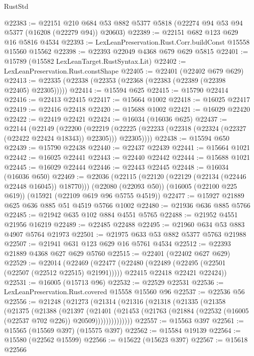 \begin{lexlean}{RustStd}
\begin{coremodule}
@22383 := @22151
    @210
    @684
    @53
    @882
    @5377
    @5818
    (@22274 @94 @53 @94 @5377 (@16208 (@22279 @94)) @20603)
@22389 := @22151 @682 @123 @629 @16 @5816 @4534
@22393 := LexLeanPreservation.Rust.Corr.buildConst @15558 @15560 @15562
@22398 := @22393 @22049 @4368 @679 @629 @5815
@22401 := @15789 (@15582 LexLeanTarget.RustSyntax.Lit)
@22402 := LexLeanPreservation.Rust.constShape
@22405 := @22401 (@22402 @679 @629)
@22413 := @22335 (@22338 (@22353 (@22368 (@22383 (@22389 (@22398 @22405) @22305)))))
@22414 := @15594 @625
@22415 := @15790 @22414
@22416 := @22413 @22415
@22417 := @15664 @1002
@22418 := @16025 @22417
@22419 := @22416 @22418
@22420 := @15688 @1002
@22421 := @16029 @22420
@22422 := @22419 @22421
@22424 := @16034 (@16036 @625)
@22437 := @22144
    (@22149
      (@22200
        (@22219 (@22225 (@22233 (@22318 (@22324 (@22327 (@22422 @22424 @18343)) @22305))) @22305))))
@22438 := @15594 @650
@22439 := @15790 @22438
@22440 := @22437 @22439
@22441 := @15664 @1021
@22442 := @16025 @22441
@22443 := @22440 @22442
@22444 := @15688 @1021
@22445 := @16029 @22444
@22446 := @22443 @22445
@22448 := @16034 (@16036 @650)
@22469 := @22036
    (@22115 (@22120 (@22129 (@22134 (@22446 @22448 @16045)) @18770)))
    (@22080 (@22093 @50))
    (@16005 (@22100 @225 @619))
    (@15921 (@22109 @619 @96 @5755 @4519))
@22477 := @15927 @21889 @625 @636 @885 @51 @4519 @5766 @1002
@22480 := @21936 @636 @885 @5766
@22485 := @21942 @635 @102 @884 @4551 @5765
@22488 := @21952 @4551 @21956 @16219
@22489 := @22485 @22488
@22495 := @21960 @634 @53 @883 @4907 @5764 @21973
@22501 := @21975 @633 @53 @882 @5377 @5763 @21988
@22507 := @21941 @631 @123 @629 @16 @5761 @4534
@22512 := @22393 @21889 @4368 @627 @629 @5760
@22515 := @22401 (@22402 @627 @629)
@22529 := @22014
    (@22469
      (@22477
        (@22480 (@22489 (@22495 (@22501 (@22507 (@22512 @22515) @21991)))))
        @22415
        @22418
        @22421
        @22424))
@22531 := @16005 (@15713 @96)
@22532 := @22529 @22531
@22536 := LexLeanPreservation.Rust.covered @15558 @15560 @96
@22537 := @22536 @56
@22556 := @21248
    (@21273
      (@21314
        (@21316
          (@21318
            (@21335
              (@21358
                (@21375
                  (@21388
                    (@21397
                      (@21401
                        (@21453
                          (@21763 (@21884 (@22532 (@16005 (@22537 @702 @226)) @20509))))))))))))))
@22557 := @15563 @397
@22561 := @15565 (@15569 @397) (@15575 @397)
@22562 := @15584 @19139
@22564 := @15580 (@22562 @15599)
@22566 := @15622 (@15623 @397)
@22567 := @15618 @22566

\end{coremodule}
\end{lexlean}
